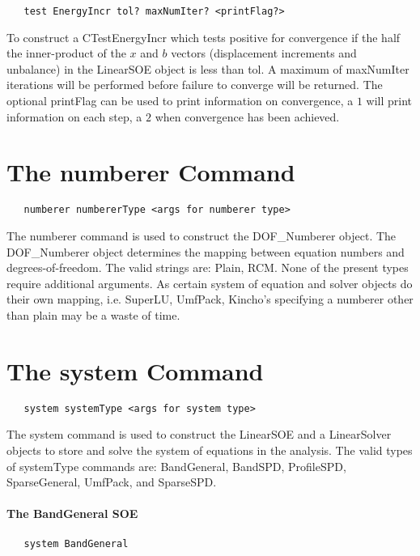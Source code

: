 \documentclass[12pt]{article}
\begin{document}
{\sf\small
\begin{verbatim}
   test EnergyIncr tol? maxNumIter? <printFlag?>
\end{verbatim}
}

\noindent To construct a CTestEnergyIncr which tests positive for
convergence if the half the inner-product of the $x$ and $b$ vectors
(displacement increments and unbalance) in the LinearSOE object is less 
than tol. A maximum of maxNumIter iterations will be performed before failure 
to converge will be returned. The optional printFlag can be used to print
information on convergence, a $1$ will print information on each step,
a $2$ when convergence has been achieved.


\section {The numberer Command}
{\sf\small
\begin{verbatim}
   numberer numbererType <args for numberer type>
\end{verbatim}
}

The numberer command is used to construct the DOF\_Numberer
object. The DOF\_Numberer object determines the mapping between
 equation numbers and degrees-of-freedom. The valid strings 
are: Plain, RCM. None of the present types require additional
arguments. As certain system of equation and solver objects do
their own mapping, i.e. SuperLU, UmfPack, Kincho's specifying a
numberer other than plain may be a waste of time.

\section {The system Command}
{\sf\small
\begin{verbatim}
   system systemType <args for system type>
\end{verbatim}
}

The system command is used to construct the LinearSOE and a LinearSolver
objects to store and solve the system of equations in the
analysis. The valid types of systemType commands are: BandGeneral,
BandSPD, ProfileSPD, SparseGeneral, UmfPack, and SparseSPD.

\paragraph{The BandGeneral SOE}

{\sf\small
\begin{verbatim}
   system BandGeneral
\end{verbatim}
}
\end{document}
